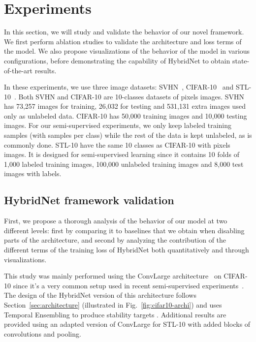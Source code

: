 \documentclass[runningheads]{llncs}
\begin{document}
\section{Experiments}
\label{sec:experiements}

In this section, we will study and validate the behavior of our novel framework. We first perform ablation studies to validate the architecture and loss terms of the model.  We also propose visualizations of the behavior of the model in various configurations, before demonstrating the capability of HybridNet to obtain state-of-the-art results.

In these experiments, we use three image datasets: SVHN~\cite{netzer2011reading}, CIFAR-10~\cite{cifar10} and STL-10~\cite{Coates2011}.
Both SVHN and CIFAR-10 are 10-classes datasets of  pixels images. SVHN has 73,257 images for training, 26,032 for testing and 531,131 extra images used only as unlabeled data. CIFAR-10 has 50,000 training images and 10,000 testing images. For our semi-supervised experiments, we only keep  labeled training samples (with  samples per class) while the rest of the data is kept unlabeled, as is commonly done.
STL-10 have the same 10 classes as CIFAR-10 with
 pixels images. It is designed for semi-supervised learning since it contains 10 folds of 1,000 labeled training images, 100,000 unlabeled training images
and 8,000 test images with labels.

\subsection{HybridNet framework validation}
\label{sec:as}

First, we propose a thorough analysis of the behavior of our model at two different levels: first by comparing it to baselines that we obtain when disabling parts of the architecture, and second by analyzing the contribution of the different terms of the training loss of HybridNet both quantitatively and through visualizations.

This study was mainly performed using the ConvLarge architecture~\cite{Rasmus2015} on CIFAR-10 since it's a very common setup used in recent semi-supervised experiments~\cite{Sajjadi2016,Laine2016,Tarvainen2017}. The design of the HybridNet version of this architecture follows Section~\ref{sec:architecture} (illustrated in Fig.~\ref{fig:cifar10-archi}) and uses Temporal Ensembling to produce stability targets . Additional results are provided using an adapted version of ConvLarge for STL-10 with added blocks of convolutions and pooling.
\end{document}
